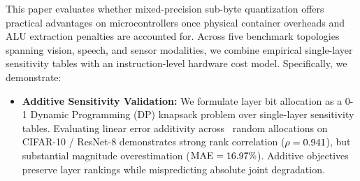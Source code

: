 \documentclass{ieeeaccess}
\begin{document}
This paper evaluates whether mixed-precision sub-byte quantization offers practical advantages on microcontrollers once physical container overheads and ALU extraction penalties are accounted for. Across five benchmark topologies spanning vision, speech, and sensor modalities, we combine empirical single-layer sensitivity tables with an instruction-level hardware cost model. Specifically, we demonstrate:
\begin{itemize}
    \item \textbf{Additive Sensitivity Validation:} We formulate layer bit allocation as a 0-1 Dynamic Programming (DP) knapsack problem over single-layer sensitivity tables. Evaluating linear error additivity across \MacroRandomAllocCount\ random allocations on CIFAR-10 / ResNet-8 demonstrates strong rank correlation ($\rho = 0.941$), but substantial magnitude overestimation ($\text{MAE} = 16.97\%$). Additive objectives preserve layer rankings while mispredicting absolute joint degradation.

\end{itemize}
\end{document}
